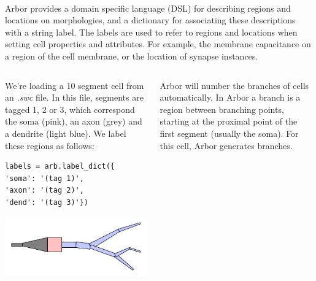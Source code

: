 \documentclass{beamer}
\newcommand*\circled[1]{\tikz[baseline=(char.base)]{\node[shape=circle,fill,inner sep=2pt] (char) {\textcolor{white}{#1}};}} %
\begin{document}
\begin{frame}[t, fragile]
  \textbf{}\\
      Arbor provides a domain specific language (DSL) for describing regions and locations on morphologies, and a dictionary for associating these descriptions with a string label. The labels are used to refer to regions and locations when setting cell properties and attributes. For example, the membrane capacitance on a region of the cell membrane, or the location of synapse instances.
      \newline

      \begin{columns}[onlytextwidth,T]

        \begin{column}{0.33\textwidth}
          \circled{1} We're loading a 10 segment cell from an \emph{.swc} file. In this file, segments are tagged 1, 2 or 3, which correspond the soma (pink), an axon (grey) and a dendrite (light blue). We label these regions as follows:
\begin{verbatim}
labels = arb.label_dict({
'soma': '(tag 1)',
'axon': '(tag 2)',
'dend': '(tag 3)'})
\end{verbatim}
          \begin{center}\includegraphics[width=0.8\linewidth]{scripts/morph.pdf}\end{center}
        \end{column}

        \begin{column}{0.33\textwidth}
          \circled{2} Arbor will number the branches of cells automatically. In Arbor a branch is a region between branching points, starting at the proximal point {\color{red}\circled{-}} of the first segment (usually the soma). For this cell, Arbor generates {\color{mediumslateblue}\circled{6}} branches.
          \newline


\end{column}
\end{columns}
\end{frame}
\end{document}
